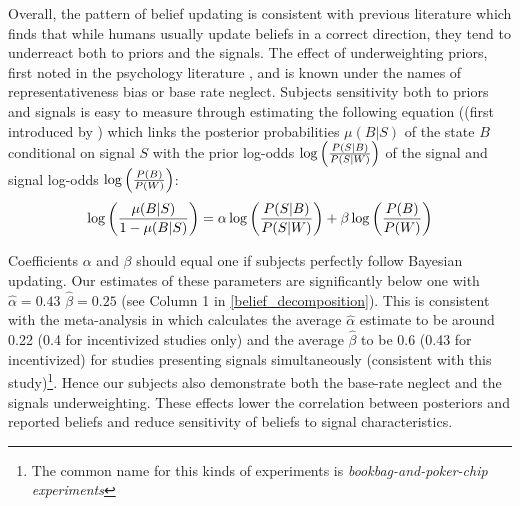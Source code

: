 \documentclass[12pt,a4paper]{article}
\begin{document}
Overall, the pattern of belief updating is consistent with previous literature which finds that while humans usually update beliefs in a correct direction, they tend to underreact both to priors and the signals. The effect of underweighting priors, first noted in the psychology literature \citep*{phillips_conservatism_1966-1, tversky_belief_1971, kahneman_subjective_1972}, and is known under the names of representativeness bias or base rate neglect. Subjects sensitivity both to priors and signals is easy to measure through estimating the following equation ((first introduced by \citet{grether_bayes_1980}) which links the posterior probabilities $\mu(B|S)$ of the state $B$ conditional on signal $S$ with the prior log-odds $\log\left({P(S|B) \over P(S|W)}\right)$ of the signal and signal log-odds $\log \left({P(B)\over P(W)}\right)$: 
\begin{equation}
\log\left({\mu(B|S) \over 1-\mu(B|S)}\right)=\alpha \log\left({P(S|B) \over P(S|W)}\right)+\beta \log \left({P(B)\over P(W)}\right)
\end{equation}

Coefficients $\alpha$ and $\beta$ should equal one if subjects perfectly follow Bayesian updating. Our estimates of these parameters are significantly below one with $\hat \alpha=0.43$ $\hat \beta=0.25$ (see Column 1 in \ref{belief_decomposition}). This is consistent with the meta-analysis in \citet{benjamin_chapter_2019} which calculates the average $\hat \alpha$ estimate to be around 0.22 (0.4 for incentivized studies only) and the average $\hat \beta$ to be 0.6 (0.43 for incentivized) for studies presenting signals simultaneously (consistent with this study)\footnote{The common name for this kinds of experiments is \textit{bookbag-and-poker-chip experiments}}. Hence our subjects also demonstrate both the base-rate neglect and the signals underweighting. These effects lower the correlation between posteriors and reported beliefs and reduce sensitivity of beliefs to signal characteristics.  


\end{document}
